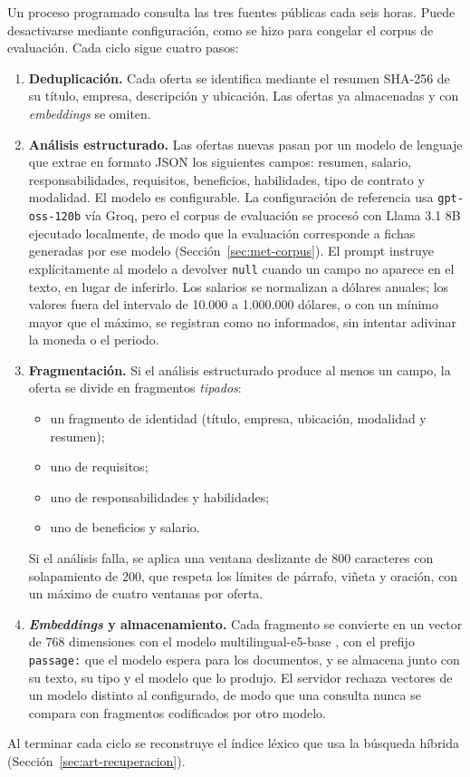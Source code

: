 Un proceso programado consulta las tres fuentes públicas cada seis horas. Puede desactivarse mediante configuración, como se hizo para congelar el corpus de evaluación. Cada ciclo sigue cuatro pasos:
\begin{enumerate}
    \item \textbf{Deduplicación.} Cada oferta se identifica mediante el resumen SHA-256 de su título, empresa, descripción y ubicación. Las ofertas ya almacenadas y con \textit{embeddings} se omiten.
    \item \textbf{Análisis estructurado.} Las ofertas nuevas pasan por un modelo de lenguaje que extrae en formato JSON los siguientes campos: resumen, salario, responsabilidades, requisitos, beneficios, habilidades, tipo de contrato y modalidad. El modelo es configurable. La configuración de referencia usa \texttt{gpt-oss-120b} vía Groq, pero el corpus de evaluación se procesó con Llama 3.1 8B ejecutado localmente, de modo que la evaluación corresponde a fichas generadas por ese modelo (Sección~\ref{sec:met-corpus}). El prompt instruye explícitamente al modelo a devolver \texttt{null} cuando un campo no aparece en el texto, en lugar de inferirlo. Los salarios se normalizan a dólares anuales; los valores fuera del intervalo de 10.000 a 1.000.000 dólares, o con un mínimo mayor que el máximo, se registran como no informados, sin intentar adivinar la moneda o el periodo.
    \item \textbf{Fragmentación.} Si el análisis estructurado produce al menos un campo, la oferta se divide en fragmentos \emph{tipados}:
    \begin{itemize}
        \item un fragmento de identidad (título, empresa, ubicación, modalidad y resumen);
        \item uno de requisitos;
        \item uno de responsabilidades y habilidades;
        \item uno de beneficios y salario.
    \end{itemize}
    Si el análisis falla, se aplica una ventana deslizante de 800 caracteres con solapamiento de 200, que respeta los límites de párrafo, viñeta y oración, con un máximo de cuatro ventanas por oferta.
    \item \textbf{\textit{Embeddings} y almacenamiento.} Cada fragmento se convierte en un vector de 768 dimensiones con el modelo multilingual-e5-base \citep{Wang2024mE5}, con el prefijo \texttt{passage:} que el modelo espera para los documentos, y se almacena junto con su texto, su tipo y el modelo que lo produjo. El servidor rechaza vectores de un modelo distinto al configurado, de modo que una consulta nunca se compara con fragmentos codificados por otro modelo.
\end{enumerate}
Al terminar cada ciclo se reconstruye el índice léxico que usa la búsqueda híbrida (Sección~\ref{sec:art-recuperacion}).

